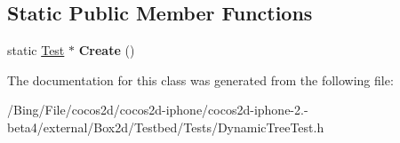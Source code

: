 \subsection*{Static Public Member Functions}
\begin{DoxyCompactItemize}
\item 
\hypertarget{class_dynamic_tree_test_a0f7a49fb406b5a743476569f5e0f1f33}{static \hyperlink{class_test}{Test} $\ast$ {\bfseries Create} ()}\label{class_dynamic_tree_test_a0f7a49fb406b5a743476569f5e0f1f33}

\end{DoxyCompactItemize}


The documentation for this class was generated from the following file\-:\begin{DoxyCompactItemize}
\item 
/\-Bing/\-File/cocos2d/cocos2d-\/iphone/cocos2d-\/iphone-\/2.-\/beta4/external/\-Box2d/\-Testbed/\-Tests/Dynamic\-Tree\-Test.\-h\end{DoxyCompactItemize}
